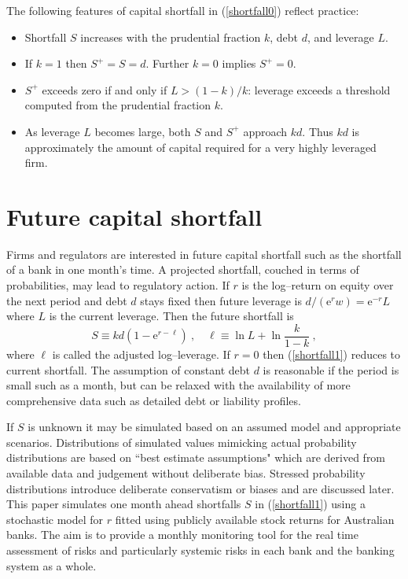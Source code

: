 \documentclass[authoryear]{elsarticle}
\newcommand{\e}{\mathrm{e}}
\newcommand{\cq}{\ ,\quad }
\newcommand{\eref}[1]{(\ref{#1})}
\newcommand{\bi}{\begin{itemize}}
\renewcommand{\i}{\item}
\newcommand{\ei}{\end{itemize}}
\begin{document}
The following features of capital shortfall in \eref{shortfall0} reflect practice:
\bi

\i Shortfall $S$ increases with the prudential fraction $k$, debt $d$, and leverage $L$.


\i If  $k=1$ then $S^+=S=d$.  Further $k=0$ implies $S^+=0$.


\i $S^+$ exceeds zero if and only if $L>(1-k)/k$: leverage exceeds a threshold computed from the prudential fraction $k$.


\i As  leverage $L$ becomes large,  both $S$ and $S^+$ approach $k d$. Thus $kd$ is approximately the amount of capital required for a very highly leveraged firm.

\ei

\section{Future capital shortfall}\label{s_expshort}

Firms and regulators are interested in future capital shortfall such as the shortfall of a bank in one month's time.   A projected shortfall, couched in terms of  probabilities, may lead to regulatory action.  If $r$ is the log--return on equity over the next period and debt $d$ stays fixed then  future leverage is $d/(\e^r w)= \e^{-r}L$ where $L$ is the current leverage.  Then the future shortfall is
\begin{equation}\label{shortfall1}
S \equiv k d  (1-\e^{r-\ell})\cq \ell\equiv \ln L + \ln\frac{k}{1-k}   \  ,
\end{equation}
where $\ell$ is called the adjusted log--leverage.   If $r=0$ then \eref{shortfall1} reduces to current shortfall.
The assumption of constant debt $d$ is reasonable if the period is small such as a month, but can be relaxed with the availability of more comprehensive data such as detailed debt or liability profiles.

If $S$ is unknown it may be simulated based on an assumed model and appropriate scenarios.     Distributions of simulated values mimicking actual probability distributions are based on ``best estimate assumptions" which are derived from available data and judgement without deliberate bias. Stressed probability distributions  introduce deliberate conservatism or biases and are discussed later.
This paper simulates one month ahead shortfalls $S$ in \eref{shortfall1} using  a stochastic model for $r$ fitted using publicly available stock returns for Australian banks.   The aim is to provide a monthly monitoring tool for the real time assessment of risks and particularly systemic risks in each bank and the banking system as a whole.
\end{document}
